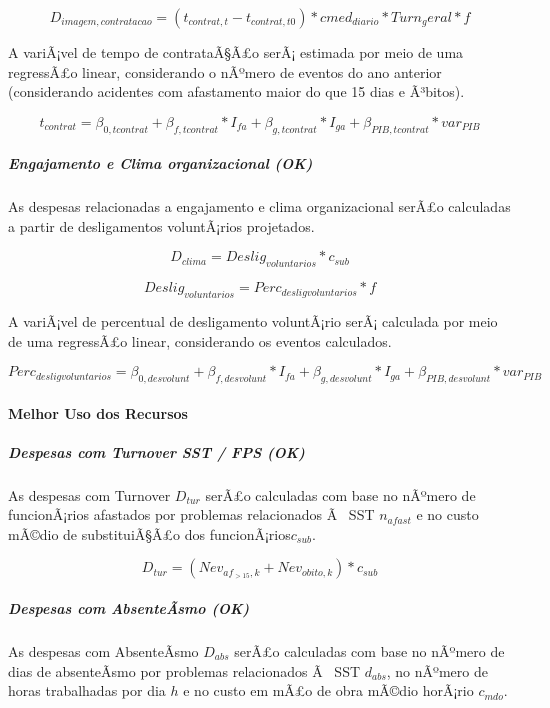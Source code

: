\documentclass[]{article}
\let\oldparagraph\paragraph
\renewcommand{\paragraph}[1]{\oldparagraph{#1}\mbox{}}
\let\oldsubparagraph\subparagraph
\renewcommand{\subparagraph}[1]{\oldsubparagraph{#1}\mbox{}}
\begin{document}
\[D_{imagem, contratacao} =  (t_{contrat,t} - t_{contrat,t0}) * cmed_{diario} * Turn_geral * f\]

A variÃ¡vel de tempo de contrataÃ§Ã£o serÃ¡ estimada por meio de uma
regressÃ£o linear, considerando o nÃºmero de eventos do ano anterior
(considerando acidentes com afastamento maior do que 15 dias e Ã³bitos).

\[t_{contrat} = \beta_{0,tcontrat} + \beta_{f,tcontrat} * I_{fa} + \beta_{g,tcontrat} * I_{ga} + \beta_{PIB,tcontrat} * var_{PIB}\]

\subparagraph{Engajamento e Clima organizacional
(OK)}\label{engajamento-e-clima-organizacional-ok}

As despesas relacionadas a engajamento e clima organizacional serÃ£o
calculadas a partir de desligamentos voluntÃ¡rios projetados.

\[D_{clima} = Deslig_{voluntarios} * c_{sub}\]

\[Deslig_{voluntarios} = Perc_{desligvoluntarios} * f \]

A variÃ¡vel de percentual de desligamento voluntÃ¡rio serÃ¡ calculada
por meio de uma regressÃ£o linear, considerando os eventos calculados.

\[Perc_{desligvoluntarios} = \beta_{0,desvolunt} +\beta_{f,desvolunt} * I_{fa} + \beta_{g,desvolunt} * I_{ga} + \beta_{PIB,desvolunt} * var_{PIB}\]

\paragraph{Melhor Uso dos Recursos}\label{melhor-uso-dos-recursos}

\subparagraph{Despesas com Turnover SST / FPS
(OK)}\label{despesas-com-turnover-sst-fps-ok}

As despesas com Turnover \(D_{tur}\) serÃ£o calculadas com base no
nÃºmero de funcionÃ¡rios afastados por problemas relacionados Ã~ SST
\(n_{afast}\) e no custo mÃ©dio de substituiÃ§Ã£o dos
funcionÃ¡rios\(c_{sub}\).

\[D_{tur} = (Nev_{af_{>15},k} + Nev_{obito,k}) * c_{sub}\]

\subparagraph{Despesas com AbsenteÃ­smo
(OK)}\label{despesas-com-absenteasmo-ok}

As despesas com AbsenteÃ­smo \(D_{abs}\) serÃ£o calculadas com base no
nÃºmero de dias de absenteÃ­smo por problemas relacionados Ã~ SST
\(d_{abs}\), no nÃºmero de horas trabalhadas por dia \(h\) e no custo em
mÃ£o de obra mÃ©dio horÃ¡rio \(c_{mdo}\).
\end{document}
